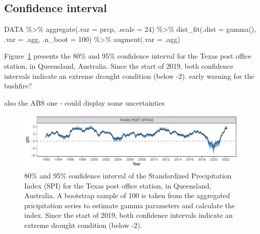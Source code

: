 \documentclass[
]{interact}
\newenvironment{Shaded}{\begin{snugshade}}{\end{snugshade}}
\newcommand{\AttributeTok}[1]{\textcolor[rgb]{0.40,0.45,0.13}{#1}}
\newcommand{\DecValTok}[1]{\textcolor[rgb]{0.68,0.00,0.00}{#1}}
\newcommand{\FunctionTok}[1]{\textcolor[rgb]{0.28,0.35,0.67}{#1}}
\newcommand{\NormalTok}[1]{\textcolor[rgb]{0.00,0.23,0.31}{#1}}
\newcommand{\SpecialCharTok}[1]{\textcolor[rgb]{0.37,0.37,0.37}{#1}}
\begin{document}
\hypertarget{confidence-interval}{%
\subsection{Confidence interval}\label{confidence-interval}}

\begin{Shaded}
\begin{Highlighting}[]
\NormalTok{DATA }\SpecialCharTok{\%\textgreater{}\%} 
  \FunctionTok{aggregate}\NormalTok{(}\AttributeTok{.var =}\NormalTok{ prcp, }\AttributeTok{.scale =} \DecValTok{24}\NormalTok{) }\SpecialCharTok{\%\textgreater{}\%} 
  \FunctionTok{dist\_fit}\NormalTok{(}\AttributeTok{.dist =} \FunctionTok{gamma}\NormalTok{(), }\AttributeTok{.var =}\NormalTok{ .agg, }\AttributeTok{.n\_boot =} \DecValTok{100}\NormalTok{) }\SpecialCharTok{\%\textgreater{}\%} 
  \FunctionTok{augment}\NormalTok{(}\AttributeTok{.var =}\NormalTok{ .agg)}
\end{Highlighting}
\end{Shaded}

Figure~\ref{fig-conf-interval} presents the 80\% and 95\% confidence
interval for the Texas post office station, in Queensland, Australia.
Since the start of 2019, both confidence intervals indicate an extreme
drought condition (below -2). early warning for the bushfire?

also the ABS one - could display some uncertainties

\begin{figure}

{\centering \includegraphics{tidyindex_files/figure-pdf/fig-conf-interval-1.pdf}

}

\caption{\label{fig-conf-interval}80\% and 95\% confidence interval of
the Standardized Precipitation Index (SPI) for the Texas post office
station, in Queensland, Australia. A bootstrap sample of 100 is taken
from the aggregated pricipitation series to estimate gamma parameters
and calculate the index. Since the start of 2019, both confidence
intervals indicate an extreme drought condition (below -2).}

\end{figure}
\end{document}
